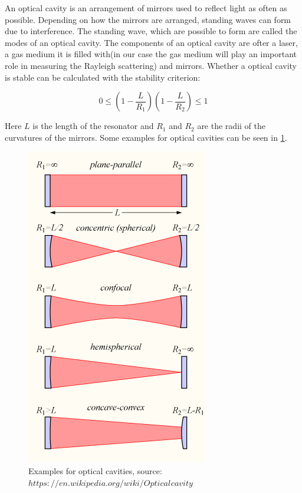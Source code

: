 \documentclass[12pt,a4paper]{article}
\begin{document}
An optical cavity is an arrangement of mirrors used to reflect light as often as possible. Depending on how the mirrors are arranged, standing waves can form due to interference. The standing wave, which are possible to form are called the modes of an optical cavity. The components of an optical cavity are ofter a laser, a gas medium it is filled with(in our case the gas medium will play an important role in measuring the Rayleigh scattering) and mirrors. Whether a optical cavity is stable can be calculated with the stability criterion:

\begin{equation}
	0 \leq (1 -  \frac{L}{R_1})(1- \frac{L}{R_2}) \leq 1
\end{equation}

Here $L$ is the length of the resonator and $R_1$ and $R_2$ are the radii of the curvatures of the mirrors. Some examples for optical cavities can be seen in \ref{optical_cavities}.

\begin{figure}[h]
	\includegraphics[scale = 0.5]{Optical-cavity1.png}
	\centering
	\caption{Examples for optical cavities, source: \href{https://en.wikipedia.org/wiki/Optical_cavity}{$https://en.wikipedia.org/wiki/Optical_{}cavity$}}
	\label{optical_cavities}
\end{figure}
\end{document}
